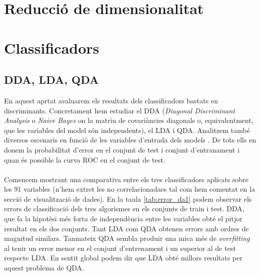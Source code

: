 \documentclass[a4paper,10pt]{article}
\begin{document}



\section{Reducció de dimensionalitat}

\section{Classificadors}
\subsection{DDA, LDA, QDA}
En aquest aprtat avaluarem els resultats dels classificadors bastats en discriminants. Concretament hem estudiar el DDA (\textit{Diagonal Discriminant Analysis} o  \textit{Naive Bayes} on la matriu de covariàncies diagonals o, equivalentment, que les variables del model són independents), el LDA i QDA. Analitzem també diversos escenaris en funció de les variables d'entrada dels models . De tots ells en donem la probabilitat d'error en el conjunt de test i conjunt d'entranament i quan és possible la curva ROC en el conjunt de test.
\\
\\
Comencem mostrant una comparativa entre els tres classificadors aplicats sobre les 91 variables (n'hem extret les no correlacionadaes tal com hem comentat en la secció de visualització de dades). En la taula \ref{tab:error_da1} podem observar els errors de classificació dels tres algorismes en els conjunts de train i test. DDA, que fa la hipotèsi més forta de independència entre les variables obté el pitjor resultat en els dos conjunts. Tant LDA com QDA obtenen errors amb ordres de magnitud similars. Tanmateix QDA sembla produir una mica més de \textit{overfitting} al tenir un error menor en el conjunt d'entrenament i un superior al de test respecte LDA. En sentit global podem dir que LDA obté millors resultats per aquest problema de QDA. 
\end{document}
